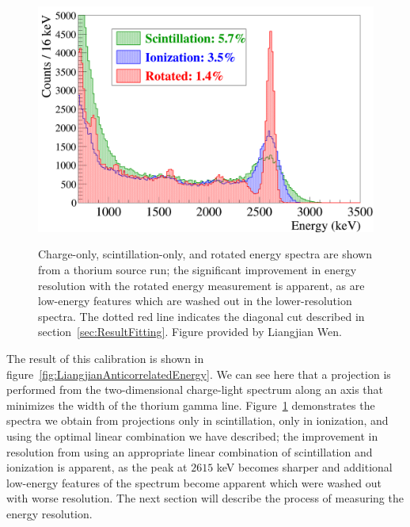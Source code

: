 \begin{figure}
\begin{center}
\includegraphics[keepaspectratio=true,width=\textwidth]{RotationTh2D_ImprovementInResolution.png}
\end{center}
\renewcommand{\baselinestretch}{1}
\small\normalsize
\begin{quote}
\caption{Charge-only, scintillation-only, and rotated energy spectra are shown from a thorium source run; the significant improvement in energy resolution with the rotated energy measurement is apparent, as are low-energy features which are washed out in the lower-resolution spectra.  The dotted red line indicates the diagonal cut described in section~\ref{sec:ResultFitting}.  Figure provided by Liangjian Wen.}
\label{fig:LiangjianRotatedSpectrumImprovement}
\end{quote}
\end{figure}
\renewcommand{\baselinestretch}{2}
\small\normalsize

The result of this calibration is shown in figure~\ref{fig:LiangjianAnticorrelatedEnergy}.  We can see here that a projection is performed from the two-dimensional charge-light spectrum along an axis that minimizes the width of the thorium gamma line.  Figure~\ref{fig:LiangjianRotatedSpectrumImprovement} demonstrates the spectra we obtain from projections only in scintillation, only in ionization, and using the optimal linear combination we have described; the improvement in resolution from using an appropriate linear combination of scintillation and ionization is apparent, as the peak at $2615$ keV becomes sharper and additional low-energy features of the spectrum become apparent which were washed out with worse resolution.  The next section will describe the process of measuring the energy resolution.

